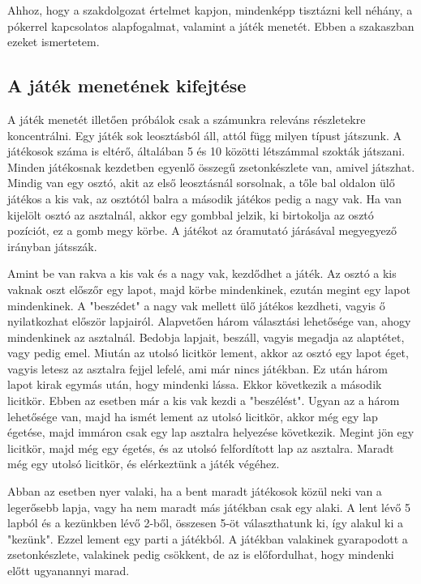 
Ahhoz, hogy a szakdolgozat értelmet kapjon, mindenképp tisztázni kell néhány, a pókerrel kapcsolatos alapfogalmat, valamint a játék menetét. Ebben a szakaszban ezeket ismertetem.

\subsection{A játék menetének kifejtése}
A játék menetét illetően próbálok csak a számunkra releváns részletekre koncentrálni. Egy játék sok leosztásból áll, attól függ milyen típust játszunk. A játékosok száma is eltérő, általában 5 és 10 közötti létszámmal szokták játszani. Minden játékosnak kezdetben egyenlő összegű zsetonkészlete van, amivel játszhat. Mindig van egy osztó, akit az első leosztásnál sorsolnak, a tőle bal oldalon ülő játékos a kis vak, az osztótól balra a második játékos pedig a nagy vak. Ha van kijelölt osztó az asztalnál, akkor egy gombbal jelzik, ki birtokolja az osztó pozíciót, ez a gomb megy körbe. A játékot az óramutató járásával megyegyező irányban játsszák.

Amint be van rakva a kis vak és a nagy vak, kezdődhet a játék. Az osztó a kis vaknak oszt előszőr egy lapot, majd körbe mindenkinek, ezután megint egy lapot mindenkinek. A "beszédet" a nagy vak mellett ülő játékos kezdheti, vagyis ő nyilatkozhat először lapjairól. Alapvetően három választási lehetősége van, ahogy mindenkinek az asztalnál. Bedobja lapjait, beszáll, vagyis megadja az alaptétet, vagy pedig emel. Miután az utolsó licitkör lement, akkor az osztó egy lapot éget, vagyis letesz az asztalra fejjel lefelé, ami már nincs játékban. Ez után három lapot kirak egymás után, hogy mindenki lássa. Ekkor következik a második licitkör. Ebben az esetben már a kis vak kezdi a "beszélést". Ugyan az a három lehetősége van, majd ha ismét lement az utolsó licitkör, akkor még egy lap égetése, majd immáron csak egy lap asztalra helyezése következik. Megint jön egy licitkör, majd még egy égetés, és az utolsó felfordított lap az asztalra. Maradt még egy utolsó licitkör, és elérkeztünk a játék végéhez.

Abban az esetben nyer valaki, ha a bent maradt játékosok közül neki van a legerősebb lapja, vagy ha nem maradt más játékban csak egy alaki. A lent lévő 5 lapból és a kezünkben lévő 2-ből, összesen 5-öt választhatunk ki, így alakul ki a "kezünk". Ezzel lement egy parti a játékból. A játékban valakinek gyarapodott a zsetonkészlete, valakinek pedig csökkent, de az is előfordulhat, hogy mindenki előtt ugyanannyi marad.

